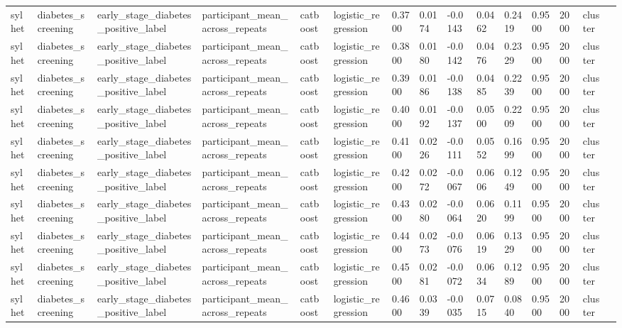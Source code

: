 \begin{tabular}{lllllllllllllll}
sylhet & diabetes\_screening & early\_stage\_diabetes\_positive\_label & participant\_mean\_across\_repeats & catboost & logistic\_regression & 0.3700 & 0.0174 & -0.0143 & 0.0462 & 0.2419 & 0.9500 & 2000 & cluster &  \\
sylhet & diabetes\_screening & early\_stage\_diabetes\_positive\_label & participant\_mean\_across\_repeats & catboost & logistic\_regression & 0.3800 & 0.0180 & -0.0142 & 0.0476 & 0.2329 & 0.9500 & 2000 & cluster &  \\
sylhet & diabetes\_screening & early\_stage\_diabetes\_positive\_label & participant\_mean\_across\_repeats & catboost & logistic\_regression & 0.3900 & 0.0186 & -0.0138 & 0.0485 & 0.2239 & 0.9500 & 2000 & cluster &  \\
sylhet & diabetes\_screening & early\_stage\_diabetes\_positive\_label & participant\_mean\_across\_repeats & catboost & logistic\_regression & 0.4000 & 0.0192 & -0.0137 & 0.0500 & 0.2209 & 0.9500 & 2000 & cluster &  \\
sylhet & diabetes\_screening & early\_stage\_diabetes\_positive\_label & participant\_mean\_across\_repeats & catboost & logistic\_regression & 0.4100 & 0.0226 & -0.0111 & 0.0552 & 0.1699 & 0.9500 & 2000 & cluster &  \\
sylhet & diabetes\_screening & early\_stage\_diabetes\_positive\_label & participant\_mean\_across\_repeats & catboost & logistic\_regression & 0.4200 & 0.0272 & -0.0067 & 0.0606 & 0.1249 & 0.9500 & 2000 & cluster &  \\
sylhet & diabetes\_screening & early\_stage\_diabetes\_positive\_label & participant\_mean\_across\_repeats & catboost & logistic\_regression & 0.4300 & 0.0280 & -0.0064 & 0.0620 & 0.1199 & 0.9500 & 2000 & cluster &  \\
sylhet & diabetes\_screening & early\_stage\_diabetes\_positive\_label & participant\_mean\_across\_repeats & catboost & logistic\_regression & 0.4400 & 0.0273 & -0.0076 & 0.0619 & 0.1329 & 0.9500 & 2000 & cluster &  \\
sylhet & diabetes\_screening & early\_stage\_diabetes\_positive\_label & participant\_mean\_across\_repeats & catboost & logistic\_regression & 0.4500 & 0.0281 & -0.0072 & 0.0634 & 0.1289 & 0.9500 & 2000 & cluster &  \\
sylhet & diabetes\_screening & early\_stage\_diabetes\_positive\_label & participant\_mean\_across\_repeats & catboost & logistic\_regression & 0.4600 & 0.0339 & -0.0035 & 0.0715 & 0.0840 & 0.9500 & 2000 & cluster &  \\

\end{tabular}
